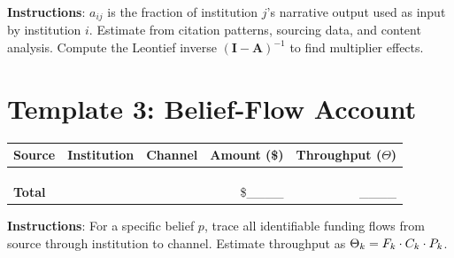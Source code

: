 \textbf{Instructions}: $a_{ij}$ is the fraction of institution $j$'s narrative output used as input by institution $i$. Estimate from citation patterns, sourcing data, and content analysis. Compute the Leontief inverse $(\bm{I} - \bm{A})^{-1}$ to find multiplier effects.

\section*{Template 3: Belief-Flow Account}

\begin{center}
\begin{tabular}{lllrr}
\toprule
\textbf{Source} & \textbf{Institution} & \textbf{Channel} & \textbf{Amount (\$)} & \textbf{Throughput ($\Theta$)} \\
\midrule
 & & & & \\
 & & & & \\
 & & & & \\
\midrule
\textbf{Total} & & & \$\_\_\_\_ & \_\_\_\_ \\
\bottomrule
\end{tabular}
\end{center}

\textbf{Instructions}: For a specific belief $p$, trace all identifiable funding flows from source through institution to channel. Estimate throughput as $\Theta_k = F_{k} \cdot C_{k} \cdot P_{k}$.
